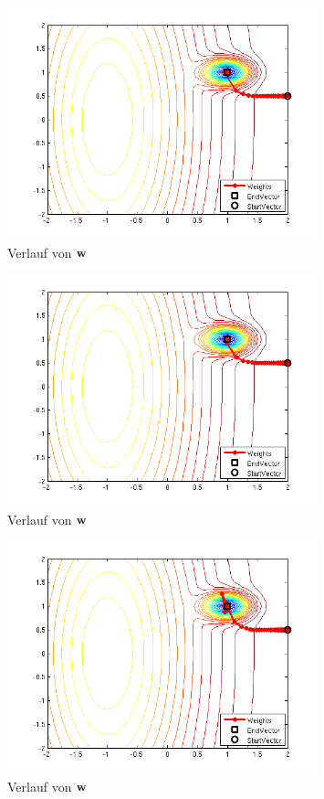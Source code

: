 \begin{figure}[h!]
  \centering
  \includegraphics[width=0.8\textwidth]{./figures/213/path_w01_eta015.png}
  \caption{Verlauf von $\mathbf{w}$}
  \label{fig:213_path_w01_eta015}
\end{figure}

\begin{figure}[h!]
  \centering
  \includegraphics[width=0.8\textwidth]{./figures/213/path_w01_eta01.png}
  \caption{Verlauf von $\mathbf{w}$}
  \label{fig:213_path_w01_eta01}
\end{figure}

\begin{figure}[h!]
  \centering
  \includegraphics[width=0.8\textwidth]{./figures/213/path_w01_eta005.png}
  \caption{Verlauf von $\mathbf{w}$}
  \label{fig:213_path_w01_eta005}
\end{figure}


